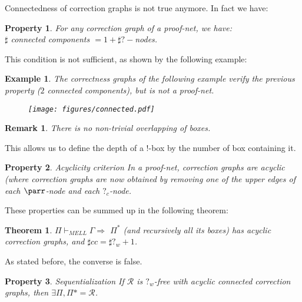 \documentclass[a4paper,10pt]{article}
\newtheorem{prop}{Property}
\newtheorem{theo}{Theorem}
\newtheorem{ex}{Example}
\newtheorem{rmk}{Remark}
\begin{document}
	Connectedness of correction graphs is not true anymore. In fact we have:
	
	\begin{prop}
		For any correction graph of a proof-net, we have: \\ $\sharp$ connected components $=1+ \sharp ?-$nodes.
	\end{prop}	
	
	This condition is not sufficient, as shown by the following example:
	
	\begin{ex}
		The correctness graphs of the following example verify the previous property ($2$ connected components), but is not a proof-net.
		\begin{figure}
		\begin{center}
			\texttt{[image: figures/connected.pdf]}
		\end{center}		
		\end{figure}		
	\end{ex}	
	
	
	\begin{rmk}
		There is no non-trivial overlapping of boxes.
	\end{rmk}	
	
	This allows us to define the depth of a $!$-box by the number of box containing it.
	
	\begin{prop}{Acyclicity criterion}
		In a proof-net, correction graphs are acyclic (where correction graphs are now obtained by removing one of the upper edges of each $\parr$-node and each $?_c$-node.
	\end{prop}	
	
	These properties can be summed up in the following theorem:
	
	\begin{theo}
		$\Pi \vdash_{MELL} \Gamma \Rightarrow$ $\Pi^*$ (and recursively all its boxes) has acyclic correction graphs, and $\sharp cc = \sharp ?_w +1$.
	\end{theo}	
	
	As stated before, the converse is false.
	
	\begin{prop}{Sequentialization}
		If $\mathcal R$ is $?_w$-free with acyclic connected correction graphs, then $\exists \Pi, \Pi* = \mathcal R$.
	\end{prop}	
	
\end{document}
